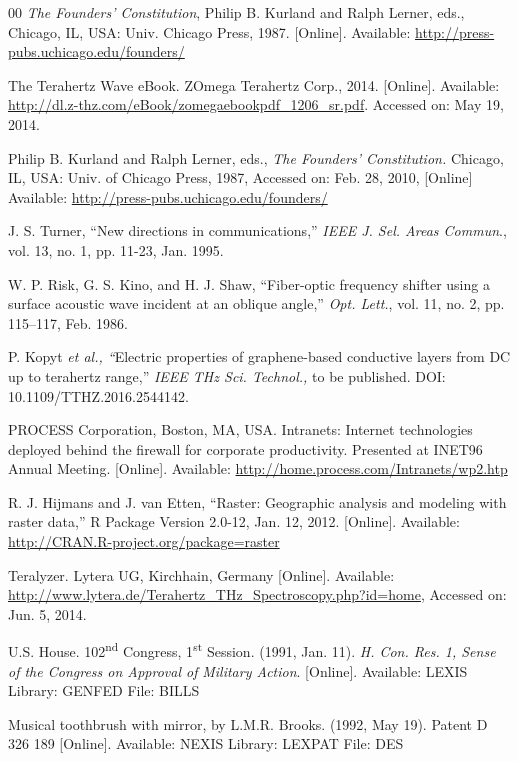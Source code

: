 \documentclass{ieeeaccess}
\begin{document}
\begin{thebibliography}{00}
 \emph{The Founders' Constitution}, Philip B. Kurland
and Ralph Lerner, eds., Chicago, IL, USA: Univ. Chicago Press, 1987.
[Online]. Available: \underline{http://press-pubs.uchicago.edu/founders/}

 The Terahertz Wave eBook. ZOmega Terahertz Corp., 2014.
[Online]. Available:
\underline{http://dl.z-thz.com/eBook/zomegaebookpdf\_1206\_sr.pdf}. Accessed on: May 19, 2014.

 Philip B. Kurland and Ralph Lerner, eds., \emph{The
Founders' Constitution.} Chicago, IL, USA: Univ. of Chicago Press,
1987, Accessed on: Feb. 28, 2010, [Online] Available:
\underline{http://press-pubs.uchicago.edu/founders/}

 J. S. Turner, ``New directions in communications,'' \emph{IEEE J. Sel. Areas Commun}., vol. 13, no. 1, pp. 11-23, Jan. 1995.

 W. P. Risk, G. S. Kino, and H. J. Shaw, ``Fiber-optic frequency shifter using a surface acoustic wave incident at an oblique angle,'' \emph{Opt. Lett.}, vol. 11, no. 2, pp. 115--117, Feb. 1986.

 P. Kopyt \emph{et al., ``}Electric properties of graphene-based conductive layers from DC up to terahertz range,'' \emph{IEEE THz Sci. Technol.,} to be published. DOI: 10.1109/TTHZ.2016.2544142.

 PROCESS Corporation, Boston, MA, USA. Intranets:
Internet technologies deployed behind the firewall for corporate
productivity. Presented at INET96 Annual Meeting. [Online].
Available: \underline{http://home.process.com/Intranets/wp2.htp}

 R. J. Hijmans and J. van Etten, ``Raster: Geographic analysis and modeling with raster data,'' R Package Version 2.0-12, Jan. 12, 2012. [Online]. Available: \underline {http://CRAN.R-project.org/package=raster}

 Teralyzer. Lytera UG, Kirchhain, Germany [Online].
Available:
\underline{http://www.lytera.de/Terahertz\_THz\_Spectroscopy.php?id=home}, Accessed on: Jun. 5, 2014.

 U.S. House. 102\textsuperscript{nd} Congress, 1\textsuperscript{st} Session. (1991, Jan. 11). \emph{H. Con. Res. 1, Sense of the Congress on Approval of}  \emph{Military Action}. [Online]. Available: LEXIS Library: GENFED File: BILLS

 Musical toothbrush with mirror, by L.M.R. Brooks. (1992, May 19). Patent D 326 189 [Online]. Available: NEXIS Library: LEXPAT File: DES


\end{thebibliography}
\end{document}
